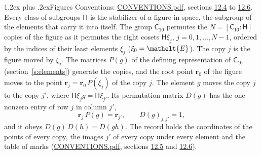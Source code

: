\documentclass[10pt,a4paper]{article}
\makeatletter
\renewcommand\section{\@startsection{section}{1}{\z@}{-3ex plus -1ex minus -.2ex}%
  {1.2ex plus .2ex}{\normalfont\large\sffamily\bfseries\color{parttitle}}}
\numberwithin{equation}{section}
\newcommand{\eltfont}[1]{{\let\sigma\eltsigma\mathelt{#1}}}
\newcommand{\grp}[1]{\mathsf{#1}}
\newcommand{\cls}[1]{\eltfont{#1}}
\newcommand{\pointr}{\mathbf{r}}
\makeatother
\begin{document}
\section{Figures}\label{s:permutation}
Conventions: \href{../../CONVENTIONS.pdf}{CONVENTIONS.pdf}, sections \href{../../CONVENTIONS.pdf\#conv.12.4}{12.4} to \href{../../CONVENTIONS.pdf\#conv.12.6}{12.6}.
Every class of subgroups $\grp{H}$ is the stabilizer of a figure in space, the subgroup of the elements that carry it into itself. \label{n:local.orbit.size}\label{n:element.coset.least}\label{n:index.coset}The group $\grp{C_{10}}$ permutes the $N = [\grp{C_{10}} : \grp{H}]$ copies of the figure as it permutes the right cosets $\grp{H}\xi_j$, $j = 0, 1, \dots, N - 1$, ordered by the indices of their least elements $\xi_j$ ($\xi_0 = \cls{E}$). The copy $j$ is the figure moved by $\xi_j$. The matrices $P(g)$ of the defining representation of $\grp{C_{10}}$ (section~\ref{s:elements}) generate the copies, and the root point $\pointr_0$ of the figure moves to the point $\pointr_j = \pointr_0\, P(\xi_j)$ of the copy $j$. \label{n:local.coset.image}The element $g$ moves the copy $j$ to the copy $j'$, where $\grp{H}\xi_j g = \grp{H}\xi_{j'}$. \label{n:local.matrix.permutation}Its permutation matrix $D(g)$ has the one nonzero entry of row $j$ in column $j'$,
\begin{equation}\label{e:perm.matrix}\pointr_j\, P(g) = \pointr_{j'}, \qquad D(g)_{j,j'} = 1,\end{equation}
and it obeys $D(g)\, D(h) = D(gh)$. The record holds the coordinates of the points of every copy, the images $j'$ of every copy under every element and the table of marks (\href{../../CONVENTIONS.pdf}{CONVENTIONS.pdf}, sections \href{../../CONVENTIONS.pdf\#conv.12.5}{12.5} and \href{../../CONVENTIONS.pdf\#conv.12.6}{12.6}).
\end{document}
